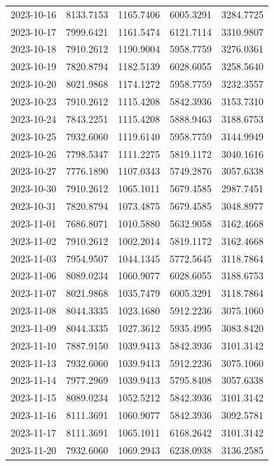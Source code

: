 {\begin{longtable}{lllll}
2023-10-16 & 8133.7153 & 1165.7406 & 6005.3291 & 3284.7725 \\
2023-10-17 & 7999.6421 & 1161.5474 & 6121.7114 & 3310.9807 \\
2023-10-18 & 7910.2612 & 1190.9004 & 5958.7759 & 3276.0361 \\
2023-10-19 & 7820.8794 & 1182.5139 & 6028.6055 & 3258.5640 \\
2023-10-20 & 8021.9868 & 1174.1272 & 5958.7759 & 3232.3557 \\
2023-10-23 & 7910.2612 & 1115.4208 & 5842.3936 & 3153.7310 \\
2023-10-24 & 7843.2251 & 1115.4208 & 5888.9463 & 3188.6753 \\
2023-10-25 & 7932.6060 & 1119.6140 & 5958.7759 & 3144.9949 \\
2023-10-26 & 7798.5347 & 1111.2275 & 5819.1172 & 3040.1616 \\
2023-10-27 & 7776.1890 & 1107.0343 & 5749.2876 & 3057.6338 \\
2023-10-30 & 7910.2612 & 1065.1011 & 5679.4585 & 2987.7451 \\
2023-10-31 & 7820.8794 & 1073.4875 & 5679.4585 & 3048.8977 \\
2023-11-01 & 7686.8071 & 1010.5880 & 5632.9058 & 3162.4668 \\
2023-11-02 & 7910.2612 & 1002.2014 & 5819.1172 & 3162.4668 \\
2023-11-03 & 7954.9507 & 1044.1345 & 5772.5645 & 3118.7864 \\
2023-11-06 & 8089.0234 & 1060.9077 & 6028.6055 & 3188.6753 \\
2023-11-07 & 8021.9868 & 1035.7479 & 6005.3291 & 3118.7864 \\
2023-11-08 & 8044.3335 & 1023.1680 & 5912.2236 & 3075.1060 \\
2023-11-09 & 8044.3335 & 1027.3612 & 5935.4995 & 3083.8420 \\
2023-11-10 & 7887.9150 & 1039.9413 & 5842.3936 & 3101.3142 \\
2023-11-13 & 7932.6060 & 1039.9413 & 5912.2236 & 3075.1060 \\
2023-11-14 & 7977.2969 & 1039.9413 & 5795.8408 & 3057.6338 \\
2023-11-15 & 8089.0234 & 1052.5212 & 5842.3936 & 3101.3142 \\
2023-11-16 & 8111.3691 & 1060.9077 & 5842.3936 & 3092.5781 \\
2023-11-17 & 8111.3691 & 1065.1011 & 6168.2642 & 3101.3142 \\
2023-11-20 & 7932.6060 & 1069.2943 & 6238.0938 & 3136.2585 \\

\end{longtable}}
